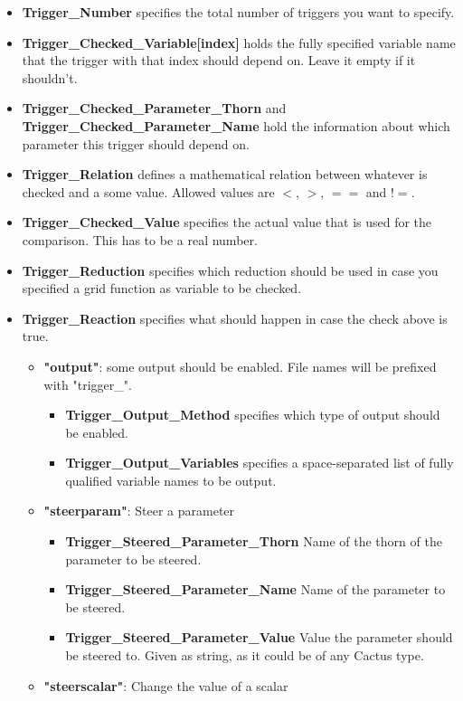 \begin{itemize}
 \item \textbf{Trigger\_Number} specifies the total number of triggers you want to specify.
 \item \textbf{Trigger\_Checked\_Variable[index]} holds the fully specified variable name that the trigger with that index should depend on. Leave it empty if it shouldn't.
 \item \textbf{Trigger\_Checked\_Parameter\_Thorn} and \textbf{Trigger\_Checked\_Parameter\_Name} hold the information about which parameter this trigger should depend on.
 \item \textbf{Trigger\_Relation} defines a mathematical relation between whatever is checked and a some value. Allowed values are $<$, $>$, $==$ and $!=$.
 \item \textbf{Trigger\_Checked\_Value} specifies the actual value that is used for the comparison. This has to be a real number.
 \item \textbf{Trigger\_Reduction} specifies which reduction should be used in case you specified a grid function as variable to be checked.
 \item \textbf{Trigger\_Reaction} specifies what should happen in case the check above is true.
  \begin{itemize}
   \item \textbf{"output"}: some output should be enabled. File names will be prefixed with "trigger\_".
    \begin{itemize}
     \item \textbf{Trigger\_Output\_Method} specifies which type of output should be enabled.
     \item \textbf{Trigger\_Output\_Variables} specifies a space-separated list of fully qualified variable names to be output.
    \end{itemize}
   \item \textbf{"steerparam"}: Steer a parameter
    \begin{itemize}
     \item \textbf{Trigger\_Steered\_Parameter\_Thorn} Name of the thorn of the parameter to be steered.
     \item \textbf{Trigger\_Steered\_Parameter\_Name} Name of the parameter to be steered.
     \item \textbf{Trigger\_Steered\_Parameter\_Value} Value the parameter should be steered to. Given as string, as it could be of any Cactus type.
    \end{itemize}
   \item \textbf{"steerscalar"}: Change the value of a scalar

\end{itemize}
\end{itemize}
